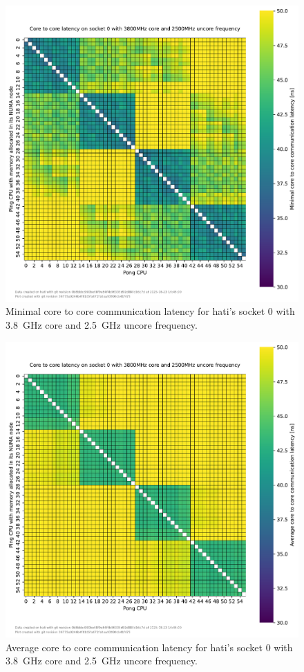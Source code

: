 \begin{figure}[]
    \centering
    \includegraphics[width=\columnwidth]{fig/core-to-core-latency/core-to-core-heatmap-min-3800-2500.pdf}
    \caption{Minimal core to core communication latency for hati's socket 0 with \SI{3.8}{\GHz} core and \SI{2.5}{\GHz} uncore frequency.}
\end{figure}
\begin{figure}[]
    \centering
    \includegraphics[width=\columnwidth]{fig/core-to-core-latency/core-to-core-heatmap-avg-3800-2500.pdf}
    \caption{Average core to core communication latency for hati's socket 0 with \SI{3.8}{\GHz} core and \SI{2.5}{\GHz} uncore frequency.}
\end{figure}

